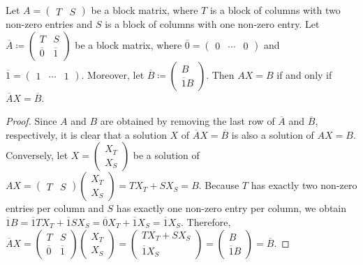 \documentclass[english,a4paper,nolineno,cleveref]{socg-lipics-v2021}
\begin{document}
\begin{proposition} \label{prop:linear_system_to_graph}
Let $A=\begin{pmatrix} T & S \end{pmatrix}$ be a block matrix, where $T$ is a block of columns with two non-zero entries and $S$ is a block of columns with one non-zero entry. Let $\overline{A}\coloneqq \begin{pmatrix}T & S \\ \overline{0} & \overline{1} \end{pmatrix}$ be a block matrix, where $\overline{0}=\begin{pmatrix} 0 & \cdots & 0 \end{pmatrix}$ and $\overline{1}=\begin{pmatrix} 1 & \cdots & 1 \end{pmatrix}$. Moreover, let $\overline{B}\coloneqq \begin{pmatrix}B \\ \overline{1}B\end{pmatrix}$. Then $AX=B$ if and only if $\overline{A}X=\overline{B}$.
\end{proposition}

\begin{proof}
Since $A$ and $B$ are obtained by removing the last row of $\overline{A}$ and $\overline{B}$, respectively, it is clear that a solution $X$ of $\overline{A}X=\overline{B}$ is also a solution of $AX=B$. Conversely, let $X=\begin{pmatrix}X_T \\ X_S\end{pmatrix}$ be a solution of $AX=\begin{pmatrix} T & S \end{pmatrix}\begin{pmatrix}X_T \\ X_S\end{pmatrix}=T X_T + S X_S=B$. Because $T$ has exactly two non-zero entries per column and $S$ has exactly one non-zero entry per column, we obtain $\overline{1}B=\overline{1}T X_T + \overline{1}S X_S=\overline{0}X_T + \overline{1}X_S=\overline{1}X_S$. Therefore, $\overline{A}X=\begin{pmatrix}T & S \\ \overline{0} & \overline{1} \end{pmatrix}\begin{pmatrix}X_T \\ X_S\end{pmatrix}=\begin{pmatrix}T X_T + S X_S \\ \overline{1}X_S\end{pmatrix}=\begin{pmatrix}B \\ \overline{1}B\end{pmatrix}=\overline{B}$. 
\end{proof}
\end{document}
